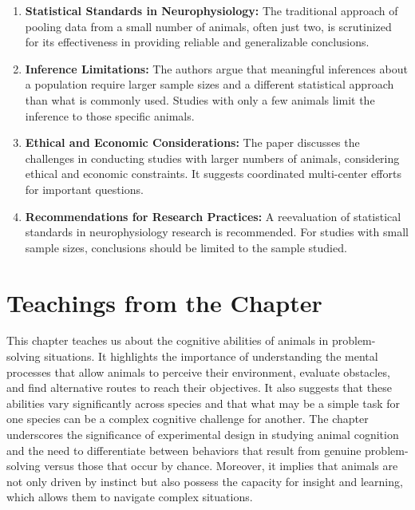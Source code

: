 \documentclass{article}
\begin{document}
\begin{enumerate}
    \item \textbf{Statistical Standards in Neurophysiology:} The traditional approach of pooling data from a small number of animals, often just two, is scrutinized for its effectiveness in providing reliable and generalizable conclusions.
    
    \item \textbf{Inference Limitations:} The authors argue that meaningful inferences about a population require larger sample sizes and a different statistical approach than what is commonly used. Studies with only a few animals limit the inference to those specific animals.
    
    \item \textbf{Ethical and Economic Considerations:} The paper discusses the challenges in conducting studies with larger numbers of animals, considering ethical and economic constraints. It suggests coordinated multi-center efforts for important questions.
    
    \item \textbf{Recommendations for Research Practices:} A reevaluation of statistical standards in neurophysiology research is recommended. For studies with small sample sizes, conclusions should be limited to the sample studied.
\end{enumerate} 

\newpage
\section{Teachings from the Chapter}

This chapter teaches us about the cognitive abilities of animals in problem-solving situations. It highlights the importance of understanding the mental processes that allow animals to perceive their environment, evaluate obstacles, and find alternative routes to reach their objectives. It also suggests that these abilities vary significantly across species and that what may be a simple task for one species can be a complex cognitive challenge for another. The chapter underscores the significance of experimental design in studying animal cognition and the need to differentiate between behaviors that result from genuine problem-solving versus those that occur by chance. Moreover, it implies that animals are not only driven by instinct but also possess the capacity for insight and learning, which allows them to navigate complex situations.
\end{document}
